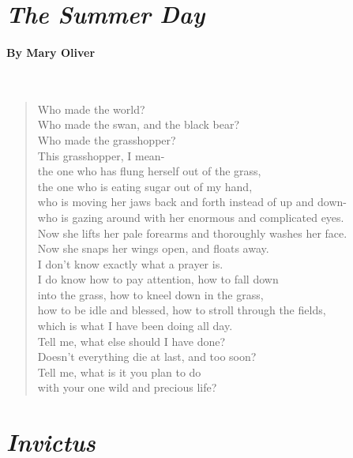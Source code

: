 \documentclass[12pt, openany, letterpaper]{memoir}
\begin{document}
\newpage
{}
\section*{\emph{The Summer Day}}
\paragraph{By Mary Oliver}~
\begin{verse}
	Who made the world?\\
	Who made the swan, and the black bear?\\
	Who made the grasshopper?\\
	This grasshopper, I mean-\\
	the one who has flung herself out of the grass,\\
	the one who is eating sugar out of my hand,\\
	who is moving her jaws back and forth instead of up and down-\\
	who is gazing around with her enormous and complicated eyes.\\
	Now she lifts her pale forearms and thoroughly washes her face.\\
	Now she snaps her wings open, and floats away.\\
	I don't know exactly what a prayer is.\\
	I do know how to pay attention, how to fall down\\
	into the grass, how to kneel down in the grass,\\
	how to be idle and blessed, how to stroll through the fields,\\
	which is what I have been doing all day.\\
	Tell me, what else should I have done?\\
	Doesn't everything die at last, and too soon?\\
	Tell me, what is it you plan to do\\
	with your one wild and precious life?
\end{verse}

\newpage
\section*{\emph{Invictus}}
\end{document}
